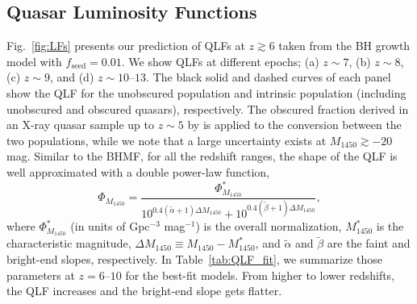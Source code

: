 \documentclass[twocolumn, twocolappendix]{aastex63}
\newcommand{\fseed}{f_\mathrm{seed}}
\newcommand{\Muv}{M_{1450}}
\begin{document}
\begin{CJK*}{UTF8}{gbsn}
\subsection{Quasar Luminosity Functions}
\label{sec:qlfglf}


Fig.~\ref{fig:LFs} presents our prediction of QLFs at $z\gtrsim 6$ taken from the BH growth model with $\fseed=0.01$.
We show QLFs at different epochs; (a) $z\sim 7$, (b) $z\sim 8$, (c) $z\sim 9$, and (d) $z\sim 10$--$13$.
The black solid and dashed curves of each panel show the QLF for the unobscured population 
and intrinsic population (including unobscured and obscured quasars), respectively.
The obscured fraction derived in an X-ray quasar sample up to $z\sim 5$ by \citet{2014ApJ...786..104U} is applied to the conversion between the two populations,
while we note that a large uncertainty exists at $\Muv \gtrsim-20$ mag.
Similar to the BHMF, for all the redshift ranges, the shape of the QLF is well approximated with a double power-law function,
%
\begin{equation}
\Phi_{\Muv} = \frac{\Phi_{\Muv}^\ast}
{10^{0.4(\tilde \alpha+1)\Delta \Muv} + 10^{0.4(\tilde \beta+1)\Delta \Muv}},
\end{equation}
%
where $\Phi_{\Muv}^\ast$ (in units of Gpc$^{-3}$ mag$^{-1}$) is the overall normalization, $\Muv^\ast$ is the characteristic magnitude,
$\Delta \Muv \equiv \Muv - \Muv^\ast$, and $\tilde \alpha$ and $\tilde \beta$ are the faint and bright-end slopes, respectively.
In Table~\ref{tab:QLF_fit}, we summarize those parameters at $z=6$--$10$ for the best-fit models.
From higher to lower redshifts, the QLF increases and the bright-end slope gets flatter.



\end{CJK*}
\end{document}
